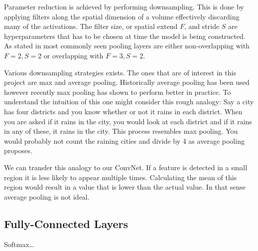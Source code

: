 Parameter reduction is achieved by performing downsampling. This is done by applying filters along the spatial dimension of a volume effectively discarding many of the activations. The filter size, or spatial extend $F$, and stride $S$ are hyperparameters that has to be chosen at time the model is being constructed. As stated in \cite{cs231n} most commonly seen pooling layers are either non-overlapping with $F=2, S=2$ or overlapping with $F=3, S=2$.

Various downsampling strategies exists. The ones that are of interest in this project are max and average pooling. Historically average pooling has been used however recently max pooling has shown to perform better in practice. To understand the intuition of this one might consider this rough analogy: Say a city has four districts and you know whether or not it rains in each district. When you are asked if it rains in the city, you would look at each district and if it rains in any of these, it rains in the city. This process resembles max pooling. You would probably not count the raining cities and divide by 4 as average pooling proposes. 

We can transfer this analogy to our ConvNet. If a feature is detected in a small region it is less likely to appear multiple times. Calculating the mean of this region would result in a value that is lower than the actual value. In that sense average pooling is not ideal.


\subsection{Fully-Connected Layers} %
\label{sub:fc_layers}

Softmax\ldots


